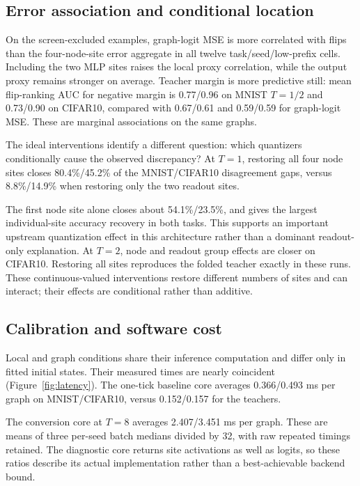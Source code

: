 \subsection{Error association and conditional location}

On the screen-excluded examples, graph-logit MSE is more correlated with flips than the four-node-site error aggregate in all twelve task/seed/low-prefix cells. Including the two MLP sites raises the local proxy correlation, while the output proxy remains stronger on average. Teacher margin is more predictive still: mean flip-ranking AUC for negative margin is 0.77/0.96 on MNIST $T=1/2$ and 0.73/0.90 on CIFAR10, compared with 0.67/0.61 and 0.59/0.59 for graph-logit MSE. These are marginal associations on the same graphs.

The ideal interventions identify a different question: which quantizers conditionally cause the observed discrepancy? At $T=1$, restoring all four node sites closes 80.4\%/45.2\% of the MNIST/CIFAR10 disagreement gaps, versus 8.8\%/14.9\% when restoring only the two readout sites.

The first node site alone closes about 54.1\%/23.5\%, and gives the largest individual-site accuracy recovery in both tasks. This supports an important upstream quantization effect in this architecture rather than a dominant readout-only explanation. At $T=2$, node and readout group effects are closer on CIFAR10. Restoring all sites reproduces the folded teacher exactly in these runs. These continuous-valued interventions restore different numbers of sites and can interact; their effects are conditional rather than additive.



\subsection{Calibration and software cost}

Local and graph conditions share their inference computation and differ only in fitted initial states. Their measured times are nearly coincident (Figure~\ref{fig:latency}). The one-tick baseline core averages 0.366/0.493 ms per graph on MNIST/CIFAR10, versus 0.152/0.157 for the teachers.

The conversion core at $T=8$ averages 2.407/3.451 ms per graph. These are means of three per-seed batch medians divided by 32, with raw repeated timings retained. The diagnostic core returns site activations as well as logits, so these ratios describe its actual implementation rather than a best-achievable backend bound.

